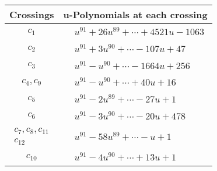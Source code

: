 \documentclass[1p]{elsarticle_modified}
\theoremstyle{definition}
\begin{document}
\begin{tabular}{m{50pt}|m{274pt}}
Crossings & \hspace{64pt}u-Polynomials at each crossing \\
\hline $$\begin{aligned}c_{1}\end{aligned}$$&$\begin{aligned}
&u^{91}+26 u^{89}+\cdots+4521 u-1063
\end{aligned}$\\
\hline $$\begin{aligned}c_{2}\end{aligned}$$&$\begin{aligned}
&u^{91}+3 u^{90}+\cdots-107 u+47
\end{aligned}$\\
\hline $$\begin{aligned}c_{3}\end{aligned}$$&$\begin{aligned}
&u^{91}- u^{90}+\cdots-1664 u+256
\end{aligned}$\\
\hline $$\begin{aligned}c_{4},c_{9}\end{aligned}$$&$\begin{aligned}
&u^{91}- u^{90}+\cdots+40 u+16
\end{aligned}$\\
\hline $$\begin{aligned}c_{5}\end{aligned}$$&$\begin{aligned}
&u^{91}-2 u^{89}+\cdots-27 u+1
\end{aligned}$\\
\hline $$\begin{aligned}c_{6}\end{aligned}$$&$\begin{aligned}
&u^{91}-3 u^{90}+\cdots-20 u+478
\end{aligned}$\\
\hline $$\begin{aligned}c_{7},c_{8},c_{11}\\c_{12}\end{aligned}$$&$\begin{aligned}
&u^{91}-58 u^{89}+\cdots- u+1
\end{aligned}$\\
\hline $$\begin{aligned}c_{10}\end{aligned}$$&$\begin{aligned}
&u^{91}-4 u^{90}+\cdots+13 u+1
\end{aligned}$\\
\hline
\end{tabular}\\~\\
\end{document}
